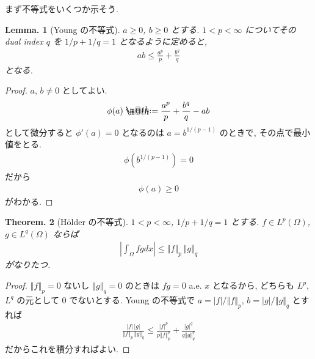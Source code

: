 \documentclass[openany, a4paper, oneside]{jsbook}
\makeatletter
\newcommand*{\defeq}{\mathrel{\rlap{%
\raisebox{0.3ex}{$\m@th\cdot$}}%
\raisebox{-0.3ex}{$\m@th\cdot$}}%
=}
\theoremstyle{break}
\newtheorem{thm}{Theorem.}[section]
\newtheorem{lem}[thm]{Lemma.}
\theoremstyle{breakdefn}
\newcommand{\abs}[1]{\left|#1\right|}
\newcommand{\norm}[1]{\left\Vert#1\right\Vert}
\newcommand{\rbk}[1]{\left (#1\right)}
\makeatother
\begin{document}
まず不等式をいくつか示そう.
\begin{lem}[Young の不等式]
 $a \ge 0$, $b \ge 0$ とする.
 $1 < p < \infty$ についてその dual index $q$ を $1/p + 1/q = 1$ となるように定めると,
 \begin{align}
  ab
  \le
  \frac{a^p}{p} + \frac{b^q}{q}
 \end{align}
 となる.
\end{lem}
\begin{proof}
$a$, $b \neq 0$ としてよい.
\begin{align}
 \phi(a)
 \defeq
 \frac{a^p}{p} + \frac{b^q}{q} -ab
\end{align}
として微分すると $\phi'(a) = 0$ となるのは $a = b^{1/{(p-1)}}$ のときで, その点で最小値をとる.
\begin{align}
 \phi \rbk{b^{1/{(p-1)}}}
 =
 0
\end{align}
だから
\begin{align}
 \phi(a) \ge 0
\end{align}
がわかる.
\end{proof}

\begin{thm}[H\"older の不等式]
 $1 < p < \infty$, $1/p + 1/q = 1$ とする.
 $f \in L^p(\Omega)$, $g \in L^q(\Omega)$
 ならば
 \begin{align}
  \abs{\int_{\Omega} fg dx}
  \leq
  \norm{f}_p \, \norm{g}_q
 \end{align}
 がなりたつ.
\end{thm}
\begin{proof}
$\norm{f}_p = 0$ ないし $\norm{g}_q = 0$ のときは $fg = 0$ a.e. $x$ となるから,
どちらも $L^p$, $L^q$ の元として $0$ でないとする.
Young の不等式で $a = \abs{f} / \norm{f}_p$, $b = \abs{g} / \norm{g}_q$ とすれば
\begin{align}
 \frac{\abs{f} \, \abs{g}}{\norm{f}_p \, \norm{g}_q}
 \le
 \frac{\abs{f}^p}{p \norm{f}_p^p} + \frac{\abs{g}^q}{q \norm{g}_q^q}
\end{align}
だからこれを積分すればよい.
\end{proof}
\end{document}
